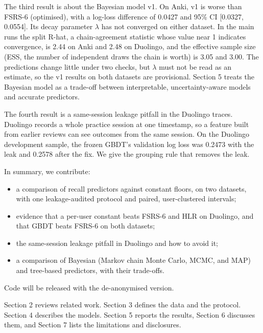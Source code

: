 The third result is about the Bayesian model v1.
On Anki, v1 is worse than FSRS-6 (optimised), with a log-loss difference of 0.0427 and 95\% CI [0.0327, 0.0554].
Its decay parameter $\lambda$ has not converged on either dataset. In the main runs the split R-hat, a chain-agreement statistic whose value near 1 indicates convergence, is 2.44 on Anki and 2.48 on Duolingo, and the effective sample size (ESS, the number of independent draws the chain is worth) is 3.05 and 3.00.
The predictions change little under two checks, but $\lambda$ must not be read as an estimate, so the v1 results on both datasets are provisional.
Section 5 treats the Bayesian model as a trade-off between interpretable, uncertainty-aware models and accurate predictors.

The fourth result is a same-session leakage pitfall in the Duolingo traces.
Duolingo records a whole practice session at one timestamp, so a feature built from earlier reviews can see outcomes from the same session.
On the Duolingo development sample, the frozen GBDT's validation log loss was 0.2473 with the leak and 0.2578 after the fix.
We give the grouping rule that removes the leak.

In summary, we contribute:
\begin{itemize}
\item a comparison of recall predictors against constant floors, on two datasets, with one leakage-audited protocol and paired, user-clustered intervals;
\item evidence that a per-user constant beats FSRS-6 and HLR on Duolingo, and that GBDT beats FSRS-6 on both datasets;
\item the same-session leakage pitfall in Duolingo and how to avoid it;
\item a comparison of Bayesian (Markov chain Monte Carlo, MCMC, and MAP) and tree-based predictors, with their trade-offs.
\end{itemize}
Code will be released with the de-anonymised version.

Section 2 reviews related work.
Section 3 defines the data and the protocol.
Section 4 describes the models.
Section 5 reports the results, Section 6 discusses them, and Section 7 lists the limitations and disclosures.
